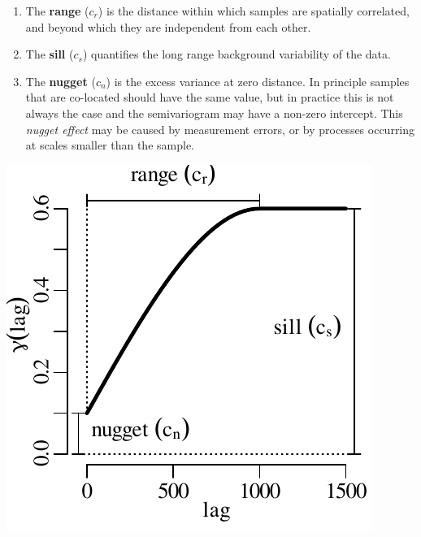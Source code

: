 \begin{enumerate}
\item The \textbf{range} ($c_r$) is the distance within which samples
  are spatially correlated, and beyond which they are independent from
  each other.

\item The \textbf{sill} ($c_s$) quantifies the long range background
  variability of the data.

\item The \textbf{nugget} ($c_n$) is the excess variance at zero
  distance. In principle samples that are co-located should have the
  same value, but in practice this is not always the case and the
  semivariogram may have a non-zero intercept. This \textit{nugget
    effect} may be caused by measurement errors, or by processes
  occurring at scales smaller than the sample.
\end{enumerate}

\noindent\begin{minipage}[t][][b]{.35\textwidth}
\includegraphics[width=\textwidth]{../figures/snr.pdf}
\end{minipage}
\begin{minipage}[t][][t]{.65\textwidth}
  \label{fig:snr}
\end{minipage}

